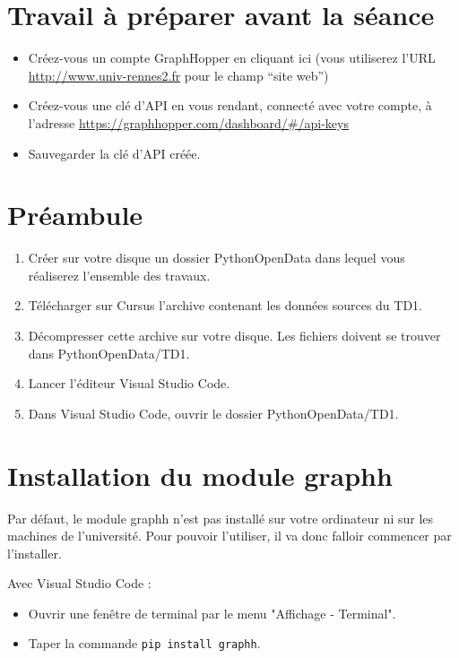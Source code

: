 \documentclass[11pt,a4paper]{article}
\begin{document}
\section*{Travail à préparer avant la séance}
\begin{itemize}
    \item Créez-vous un compte GraphHopper en cliquant ici (vous utiliserez l’URL \url{http://www.univ-rennes2.fr} pour le champ “site web”)
\item Créez-vous une clé d’API en vous rendant, connecté avec votre compte, à l’adresse \url{https://graphhopper.com/dashboard/#/api-keys}
\item Sauvegarder la clé d'API créée.
\end{itemize}

\section*{Préambule}
\begin{enumerate}
    \item Créer sur votre disque un dossier PythonOpenData dans lequel vous réaliserez l'ensemble des travaux. 
    \item Télécharger sur Cursus l'archive contenant les données sources du TD1.
    \item Décompresser cette archive sur votre disque. 
    Les fichiers doivent se trouver dans PythonOpenData/TD1.
    \item Lancer l'éditeur Visual Studio Code.
    \item Dans Visual Studio Code, ouvrir le dossier PythonOpenData/TD1. 
\end{enumerate}

\section*{Installation du module graphh}

Par défaut, le module graphh n’est pas installé sur votre ordinateur ni sur les machines de l’université. Pour pouvoir l’utiliser, il va donc falloir commencer par l’installer. 

Avec Visual Studio Code : 
\begin{itemize}
    \item Ouvrir une fenêtre de terminal par le menu "Affichage - Terminal".
    \item Taper la commande \verb+pip install graphh+.
\end{itemize}
\end{document}
